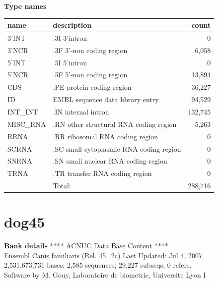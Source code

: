 \documentclass{article}
\begin{document}
\begin{Schunk}
\textbf{Type names}
\noindent\begin{tabular}{llr}
\hline \hline
name & description & count \\
\hline
3'INT  &  .3I 3'intron  &  0 \\
3'NCR  &  .3F  3'-non coding region  &  6,058 \\
5'INT  &  .5I 5'intron  &  0 \\
5'NCR  &  .5F  5'-non coding region  &  13,894 \\
CDS  &  .PE protein coding region  &  36,227 \\
ID  &  EMBL sequence data library entry  &  94,529 \\
INT\_INT  &  .IN  internal intron  &  132,745 \\
MISC\_RNA  &  .RN other structural RNA coding region  &  5,263 \\
RRNA  &  .RR ribosomal RNA coding region  &  0 \\
SCRNA  &  .SC small cytoplasmic RNA coding region  &  0 \\
SNRNA  &  .SN small nuclear RNA coding region  &  0 \\
TRNA  &  .TR transfer RNA coding region  &  0 \\
\hline
 & Total: & 288,716 \\
\hline \hline
\end{tabular}

\section{ dog45 }
\textbf{Bank details}
             ****     ACNUC Data Base Content      ****                         \\
       Ensembl Canis familiaris  (Rel. 45\_2c) Last Updated: Jul  4, 2007\\
2,531,673,731 bases; 2,585 sequences; 29,227 subseqs; 0 refers.\\
Software by M. Gouy, Laboratoire de biometrie, Universite Lyon I 


\end{Schunk}
\end{document}
